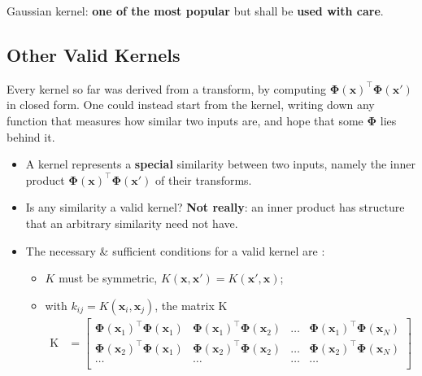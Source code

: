 \begin{moral}
    Gaussian kernel: \textbf{one of the most popular} but shall be
    \textbf{used with care}.
\end{moral}

\subsection{Other Valid Kernels}

Every kernel so far was derived from a transform, by computing
\(\bm{\Phi}(\bm{x})^\top \bm{\Phi}(\bm{x}')\) in closed form. One could
instead start from the kernel, writing down any function that measures how
similar two inputs are, and hope that some \(\bm{\Phi}\) lies behind it.
\begin{itemize}
    \item A kernel represents a \textbf{special} similarity between two
        inputs, namely the inner product \(\bm{\Phi}(\bm{x})^\top
        \bm{\Phi}(\bm{x}')\) of their transforms.
    \item Is any similarity a valid kernel? \textbf{Not really}: an inner
        product has structure that an arbitrary similarity need not have.
    \item The necessary \& sufficient conditions for a valid kernel are
        :
        \begin{itemize}
            \item \(K\) must be symmetric, \(K(\bm{x}, \bm{x}') =
                K(\bm{x}', \bm{x})\);
            \item with \(k_{ij} = K(\bm{x}_i, \bm{x}_j)\), the matrix
                \(\mathrm{K}\)
                \[
                    \begin{aligned}
                        \mathrm{K} &= \begin{bmatrix}
                            \bm{\Phi}(\bm{x}_1)^\top \bm{\Phi}(\bm{x}_1) &
                            \bm{\Phi}(\bm{x}_1)^\top \bm{\Phi}(\bm{x}_2) &
                            \dots & \bm{\Phi}(\bm{x}_1)^\top
                            \bm{\Phi}(\bm{x}_N)\\
                            \bm{\Phi}(\bm{x}_2)^\top \bm{\Phi}(\bm{x}_1) &
                            \bm{\Phi}(\bm{x}_2)^\top \bm{\Phi}(\bm{x}_2) &
                            \dots & \bm{\Phi}(\bm{x}_2)^\top
                            \bm{\Phi}(\bm{x}_N)\\
                            \dots & \dots & \dots & \dots\\

\end{bmatrix}
\end{aligned}\]
\end{itemize}
\end{itemize}
